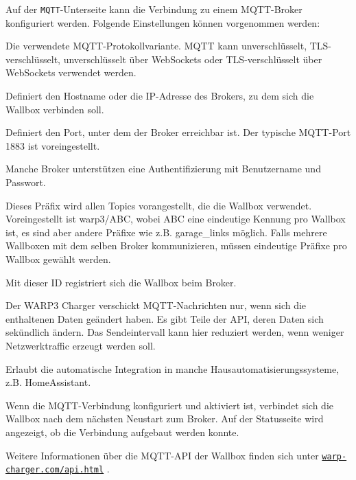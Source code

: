 \documentclass[a4paper,10pt]{article}
\newcommand\rurl[2]{%
  \href{#1}{\nolinkurl{#2}}%
}
\begin{document}
\begin{multicols*}{2}
    Auf der \texttt{MQTT}-Unterseite kann die Verbindung zu einem MQTT-Broker konfiguriert werden. Folgende Einstellungen können vorgenommen werden:
    \begin{description}[labelindent=0.5cm, leftmargin=0.5cm]
        \item[Protokoll] Die verwendete MQTT-Protokollvariante. MQTT kann unverschlüsselt, TLS-verschlüsselt, unverschlüsselt über WebSockets oder TLS-verschlüsselt über WebSockets verwendet werden.
        \item[Broker-Hostname oder -IP-Adresse] Definiert den Hostname oder die IP-Adresse des Brokers, zu dem sich die Wallbox verbinden soll.
        \columnbreak
        \item[Broker-Port] Definiert den Port, unter dem der Broker erreichbar ist. Der typische MQTT-Port 1883 ist voreingestellt.
        \item[Broker-Benutzername und -Passwort] Manche Broker unterstützen eine Authentifizierung mit Benutzername und Passwort.
        \item[Topic-Präfix] Dieses Präfix wird allen Topics vorangestellt, die die Wallbox verwendet.
              Voreingestellt ist warp3/ABC, wobei ABC eine eindeutige Kennung pro Wallbox ist,
              es sind aber andere Präfixe wie z.B. garage\_links möglich.
              Falls mehrere Wallboxen mit dem selben Broker kommunizieren,
              müssen eindeutige Präfixe pro Wallbox gewählt werden.
        \item[Client-ID] Mit dieser ID registriert sich die Wallbox beim Broker.
        \item[Sendeintervall] Der WARP3 Charger verschickt MQTT-Nachrichten nur, wenn sich die enthaltenen Daten geändert haben.
            Es gibt Teile der API, deren Daten sich sekündlich ändern. Das Sendeintervall kann hier reduziert werden, wenn weniger Netzwerktraffic
            erzeugt werden soll.
        \item[Discovery] Erlaubt die automatische Integration in manche Hausautomatisierungssysteme, z.B. HomeAssistant.
    \end{description}
    Wenn die MQTT-Verbindung konfiguriert und aktiviert ist, verbindet sich die Wallbox nach dem nächsten Neustart zum Broker. Auf der Statusseite wird angezeigt, ob die Verbindung aufgebaut werden konnte.

    Weitere Informationen über die MQTT-API der Wallbox finden sich unter
	\rurl{https://warp-charger.com/api.html}{warp-charger.com/api.html}.


\end{multicols*}
\end{document}
